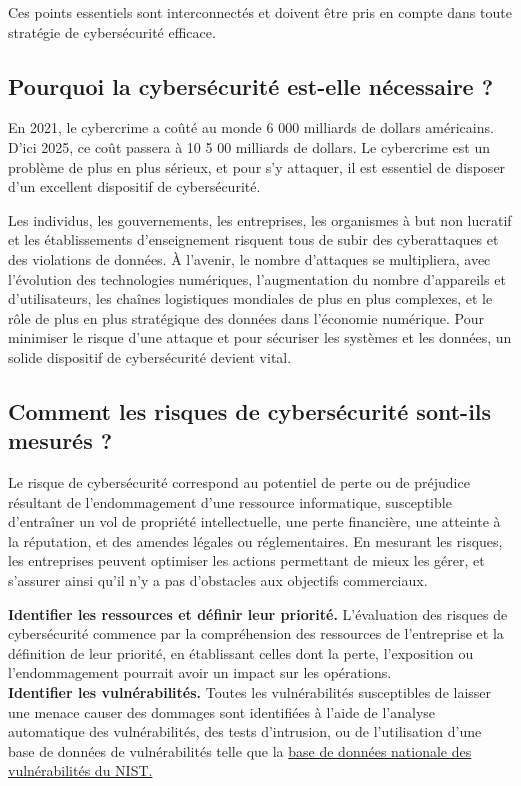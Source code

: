 Ces points essentiels sont interconnectés et doivent être pris en compte dans toute stratégie de cybersécurité efficace.
\subsection{Pourquoi la cybersécurité est-elle nécessaire ?}
En 2021, le cybercrime a coûté au monde 6 000 milliards de dollars américains. D’ici 2025, ce coût passera à 10 5 00 milliards de dollars. Le cybercrime est un problème de plus en plus sérieux, et pour s’y attaquer, il est essentiel de disposer d’un excellent dispositif de cybersécurité.

Les individus, les gouvernements, les entreprises, les organismes à but non lucratif et les établissements d’enseignement risquent tous de subir des cyberattaques et des violations de données. À l’avenir, le nombre d’attaques se multipliera, avec l’évolution des technologies numériques, l’augmentation du nombre d’appareils et d’utilisateurs, les chaînes logistiques mondiales de plus en plus complexes, et le rôle de plus en plus stratégique des données dans l’économie numérique. Pour minimiser le risque d’une attaque et pour sécuriser les systèmes et les données, un solide dispositif de cybersécurité devient vital.
\subsection{Comment les risques de cybersécurité sont-ils mesurés ?}
Le risque de cybersécurité correspond au potentiel de perte ou de préjudice résultant de l’endommagement d’une ressource informatique, susceptible d’entraîner un vol de propriété intellectuelle, une perte financière, une atteinte à la réputation, et des amendes légales ou réglementaires. En mesurant les risques, les entreprises peuvent optimiser les actions permettant de mieux les gérer, et s’assurer ainsi qu’il n’y a pas d’obstacles aux objectifs commerciaux.\pagebreak

\textbf{Identifier les ressources et définir leur priorité.} L’évaluation des risques de cybersécurité commence par la compréhension des ressources de l’entreprise et la définition de leur priorité, en établissant celles dont la perte, l’exposition ou l’endommagement pourrait avoir un impact sur les opérations.\\

\textbf{Identifier les vulnérabilités.}
 Toutes les vulnérabilités susceptibles de laisser une menace causer des dommages sont identifiées à l’aide de l’analyse automatique des vulnérabilités, des tests d’intrusion, ou de l’utilisation d’une base de données de vulnérabilités telle que la  \href{https://nvd.nist.gov/}{base de données nationale des vulnérabilités du NIST.}\\
 

